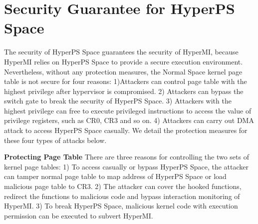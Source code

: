 \section{Security Guarantee for HyperPS Space}%
\label{sec:securityforhyperps}

The security of HyperPS Space guarantees the security of HyperMI, because HyperMI relies on HyperPS Space to provide a secure execution environment.
Nevertheless, without any protection measures, the Normal Space kernel page table is not secure for four reasons: 1)Attackers can control page table with the highest privilege after hypervisor is compromised. 2) Attackers can bypass the switch gate to break the security of HyperPS Space. 3) Attackers with the highest privilege can free to execute privileged instructions to access the value of privilege registers, such as CR0, CR3 and so on. 4) Attackers can carry out DMA attack to access HyperPS Space casually.
We detail the protection measures for these four types of attacks below.



\textbf{Protecting Page Table}
There are three reasons for controlling the two sets of kernel page tables: 1) To access casually or bypass HyperPS Space, the attacker can tamper normal page table to map address of HyperPS Space or load malicious page table to CR3.
2) The attacker can cover the hooked functions, redirect the functions to malicious code and bypass interaction monitoring of HyperMI. 3) To break HyperPS Space, malicious kernel code with execution permission can be executed to subvert HyperMI.

